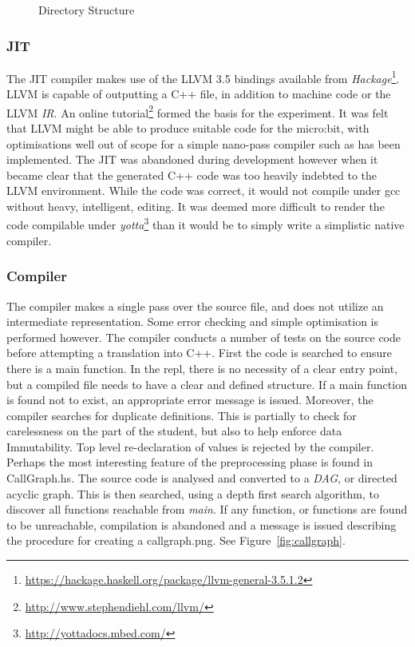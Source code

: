 \documentclass[12pt, a4paper]{report}
\begin{document}
\begin{figure}
    \label{fig:dir}
\caption{Directory Structure}
\end{figure}

\subsubsection{JIT}\label{JIT}
The JIT compiler makes use of the LLVM 3.5 bindings available from
\textit{Hackage}\footnote{\url{https://hackage.haskell.org/package/llvm-general-3.5.1.2}}. LLVM is
capable of outputting a C++ file, in addition to machine code or the LLVM \textit{IR}. An online
tutorial\footnote{\url{http://www.stephendiehl.com/llvm/}} formed the basis for the experiment. It
was felt that LLVM might be able to produce suitable code for the micro:bit, with optimisations well
out of scope for a simple nano-pass compiler such as has been implemented. The JIT was abandoned
during development however when it became clear that the generated C++ code was too heavily indebted
to the LLVM environment. While the code was correct, it would not compile under gcc without heavy,
intelligent, editing. It was deemed more difficult to render the code compilable under
\textit{yotta}\footnote{\url{http://yottadocs.mbed.com/}} than it would be to simply write a simplistic native compiler.

\subsubsection{Compiler}
The compiler makes a single pass over the source file, and does not utilize an intermediate
representation. Some error checking and simple optimisation is performed however. The compiler
conducts a number of tests on the source code before attempting a translation into C++. First the
code is searched to ensure there is a main function. In the repl, there is no necessity of a clear
entry point, but a compiled file needs to have a clear and defined structure. If a main function is
found not to exist, an appropriate error message is issued. Moreover, the compiler searches for
duplicate definitions. This is partially to check for carelessness on the part of the student, but
also to help enforce data Immutability. Top level re-declaration of values is rejected by the
compiler. Perhaps the most interesting feature of the preprocessing phase is found in CallGraph.hs.
The source code is analysed and converted to a \textit{DAG}, or directed acyclic graph. This is then
searched, using a depth first search algorithm, to discover all functions reachable from
\textit{main}. If any function, or functions are found to be unreachable, compilation is abandoned
and a message is issued describing the procedure for creating a callgraph.png. See
Figure~\ref{fig:callgraph}.
\end{document}
